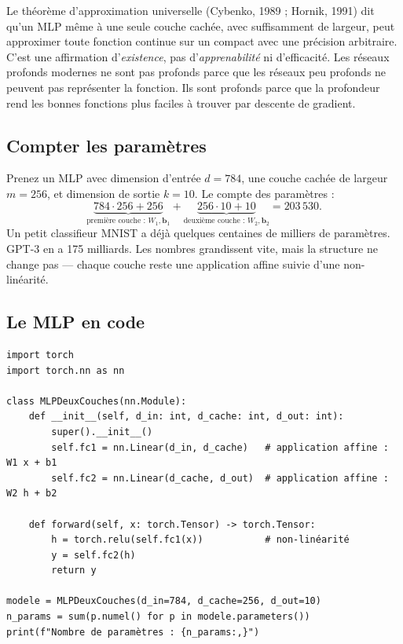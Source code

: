 \begin{aitip}
Le théorème d'approximation universelle (Cybenko, 1989 ; Hornik, 1991) dit qu'un MLP même à une seule couche cachée, avec suffisamment de largeur, peut approximer toute fonction continue sur un compact avec une précision arbitraire. C'est une affirmation d'\emph{existence}, pas d'\emph{apprenabilité} ni d'efficacité. Les réseaux profonds modernes ne sont pas profonds parce que les réseaux peu profonds ne peuvent pas représenter la fonction. Ils sont profonds parce que la profondeur rend les bonnes fonctions plus faciles à trouver par descente de gradient.
\end{aitip}

\subsection{Compter les paramètres}

Prenez un MLP avec dimension d'entrée $d = 784$, une couche cachée de largeur $m = 256$, et dimension de sortie $k = 10$. Le compte des paramètres :
\[
\underbrace{784 \cdot 256 + 256}_{\text{première couche : } W_1, \bm{b}_1} + \underbrace{256 \cdot 10 + 10}_{\text{deuxième couche : } W_2, \bm{b}_2} = 203\,530.
\]
Un petit classifieur MNIST a déjà quelques centaines de milliers de paramètres. GPT-3 en a 175 milliards. Les nombres grandissent vite, mais la structure ne change pas --- chaque couche reste une application affine suivie d'une non-linéarité.

\subsection{Le MLP en code}

\begin{verbatim}
import torch
import torch.nn as nn

class MLPDeuxCouches(nn.Module):
    def __init__(self, d_in: int, d_cache: int, d_out: int):
        super().__init__()
        self.fc1 = nn.Linear(d_in, d_cache)   # application affine : W1 x + b1
        self.fc2 = nn.Linear(d_cache, d_out)  # application affine : W2 h + b2

    def forward(self, x: torch.Tensor) -> torch.Tensor:
        h = torch.relu(self.fc1(x))           # non-linéarité
        y = self.fc2(h)
        return y

modele = MLPDeuxCouches(d_in=784, d_cache=256, d_out=10)
n_params = sum(p.numel() for p in modele.parameters())
print(f"Nombre de paramètres : {n_params:,}")
\end{verbatim}

